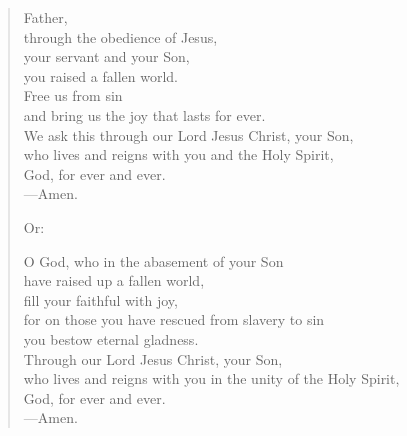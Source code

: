 \prayer

\setlength{\vleftmargin}{\prayerleftmargini}

\begin{verse}
Father,\\
through the obedience of Jesus,\\
your servant and your Son,\\
you raised a fallen world.\\
Free us from sin\\
and bring us the joy that lasts for ever.\\
We ask this through our Lord Jesus Christ, your Son,\\
who lives and reigns with you and the Holy Spirit,\\
God, for ever and ever.\\
{\color{red}---\thinspace}Amen.

{\color{red}Or:}

O God, who in the abasement of your Son\\
have raised up a fallen world,\\
fill your faithful with joy,\\
for on those you have rescued from slavery to sin\\
you bestow eternal gladness.\\
Through our Lord Jesus Christ, your Son,\\
who lives and reigns with you in the unity of the Holy Spirit,\\
God, for ever and ever.\\
{\color{red}---\thinspace}Amen.
\end{verse}

\setlength{\vleftmargin}{\defleftmargini}